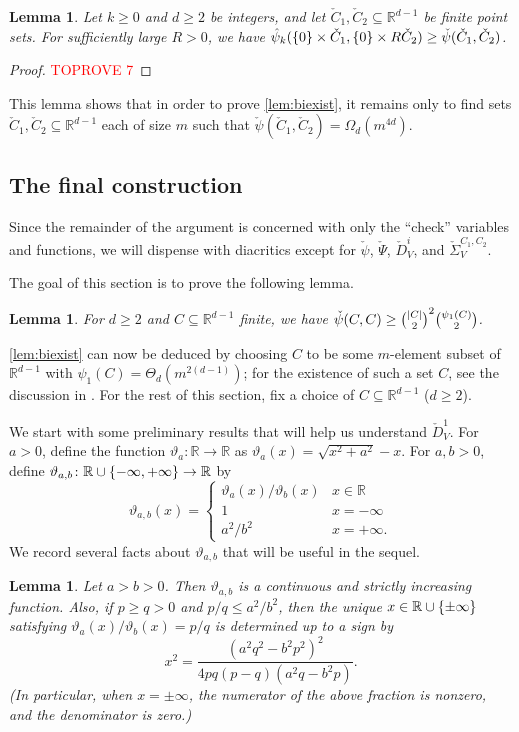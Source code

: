 \documentclass[11pt]{amsart}
\newtheorem{lemma}[theorem]{Lemma}
\theoremstyle{definition}
\DeclarePairedDelimiter{\set}{\{}{\}}
\DeclarePairedDelimiter{\abs}{\lvert}{\rvert}
\newcommand{\RR}{\mathbb{R}}
\begin{document}
\begin{lemma}\label{lem:thing}
Let $k \geq 0$ and $d \geq 2$ be integers, and let $\check C_1, \check C_2 \subseteq \RR^{d-1}$ be finite point sets.  For sufficiently large $R > 0$, we have $\hat \psi_k(\set{0} \times \check C_1, \set{0} \times R\check C_2) \geq \check \psi(\check C_1, \check C_2)$.
\end{lemma}
\begin{proof}\textcolor{red}{TOPROVE 7}\end{proof}
This lemma shows that in order to prove \cref{lem:biexist}, it remains only to find sets $\check C_1,\check C_2 \subseteq \RR^{d-1}$ each of size $m$ such that $\check\psi(\check C_1,\check C_2) = \Omega_{d}(m^{4d})$.

\subsection{The final construction}
Since the remainder of the argument is concerned with only the ``check'' variables and functions, we will dispense with diacritics except for $\check \psi$, $\check \Psi$, $\check D_V^i$, and $\check \Sigma_V^{C_1,C_2}$.


The goal of this section is to prove the following lemma.
\begin{lemma} \label{lem:psicc}
For $d \geq 2$ and $C \subseteq \RR^{d-1}$ finite, we have $\check \psi(C, C) \geq \binom{\abs{C}}{2}^2 \binom{\psi_1(C)}{2}$.
\end{lemma}
\cref{lem:biexist} can now be deduced by 
choosing $C$ to be some $m$-element subset of $\RR^{d-1}$ with $\psi_1(C) = \Theta_d(m^{2(d-1)})$; for the existence of such a set $C$, see the discussion in .  For the rest of this section, fix a choice of $C \subseteq \RR^{d-1}$ ($d\geq 2$).


We start with some preliminary results that will help us understand $\check D^1_V$.  For $a > 0$, define the function $\vartheta_a \colon \RR \to \RR$ as $\vartheta_a(x) = \sqrt{x^2+a^2}-x$. For $a, b > 0$, define $\vartheta_{a,b}\colon \RR \cup \set{-\infty,+\infty} \to \RR$ by
\[\vartheta_{a,b}(x) = \begin{cases}
\vartheta_a(x)/\vartheta_b(x) & x \in \RR \\
1 & x = -\infty \\
a^2/b^2 & x = +\infty.
\end{cases}\]
We record several facts about $\vartheta_{a,b}$ that will be useful in the sequel.
\begin{lemma} \label{lem:theta}
Let $a > b > 0$.  Then $\vartheta_{a,b}$ is a continuous and strictly increasing function. Also, if $p \geq q > 0$ and $p/q \leq a^2/b^2$, then the unique $x \in \RR \cup \set{\pm\infty}$ satisfying $\vartheta_a(x)/\vartheta_b(x)= p/q$ is determined up to a sign by
\[x^2 = \frac{(a^2q^2-b^2p^2)^2}{4pq(p-q)(a^2q-b^2p)}.\]
(In particular, when $x = \pm \infty$, the numerator of the above fraction is nonzero, and the denominator is zero.)
\end{lemma}
\end{document}
